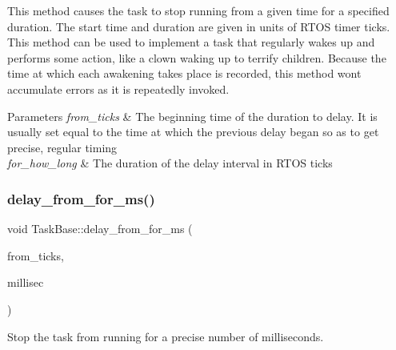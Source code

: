 This method causes the task to stop running from a given time for a specified duration. The start time and duration are given in units of R\+T\+OS timer ticks. This method can be used to implement a task that regularly wakes up and performs some action, like a clown waking up to terrify children. Because the time at which each awakening takes place is recorded, this method won\textquotesingle{}t accumulate errors as it is repeatedly invoked. 
\begin{DoxyParams}{Parameters}
{\em from\+\_\+ticks} & The beginning time of the duration to delay. It is usually set equal to the time at which the previous delay began so as to get precise, regular timing \\
\hline
{\em for\+\_\+how\+\_\+long} & The duration of the delay interval in R\+T\+OS ticks \\
\hline
\end{DoxyParams}
\mbox{\label{class_task_base_a31b1c01059c7ec4bfe60fc8332759551}} 
\subsubsection{\texorpdfstring{delay\+\_\+from\+\_\+for\+\_\+ms()}{delay\_from\_for\_ms()}}
{\footnotesize\ttfamily void Task\+Base\+::delay\+\_\+from\+\_\+for\+\_\+ms (\begin{DoxyParamCaption}\item[{Tick\+Type\+\_\+t \&}]{from\+\_\+ticks,  }\item[{Tick\+Type\+\_\+t}]{millisec }\end{DoxyParamCaption})\hspace{0.3cm}{\ttfamily [inline]}}



Stop the task from running for a precise number of milliseconds. 

